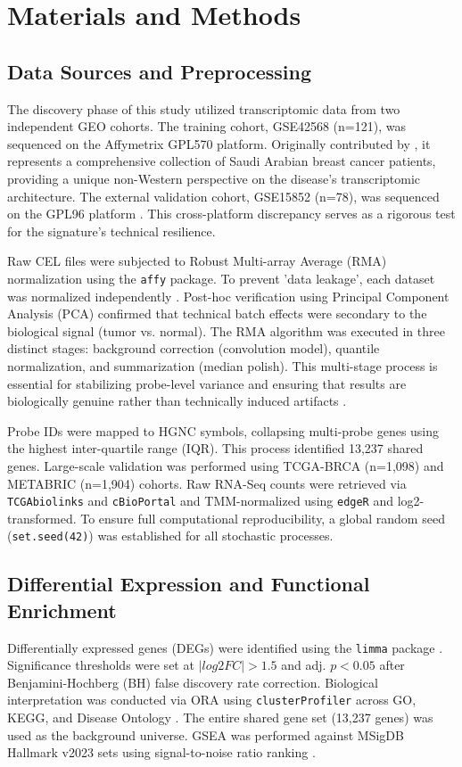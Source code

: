 \documentclass[a4paper,fleqn]{cas-sc}
\begin{document}
\section{Materials and Methods}

\subsection{Data Sources and Preprocessing}
The discovery phase of this study utilized transcriptomic data from two independent GEO cohorts. The training cohort, GSE42568 (n=121), was sequenced on the Affymetrix GPL570 platform. Originally contributed by \citet{siraj2014}, it represents a comprehensive collection of Saudi Arabian breast cancer patients, providing a unique non-Western perspective on the disease's transcriptomic architecture. The external validation cohort, GSE15852 (n=78), was sequenced on the GPL96 platform \citep{sims2014}. This cross-platform discrepancy serves as a rigorous test for the signature's technical resilience.

Raw CEL files were subjected to Robust Multi-array Average (RMA) normalization using the \texttt{affy} package. To prevent 'data leakage', each dataset was normalized independently \citep{sims2014}. Post-hoc verification using Principal Component Analysis (PCA) confirmed that technical batch effects were secondary to the biological signal (tumor vs. normal). The RMA algorithm was executed in three distinct stages: background correction (convolution model), quantile normalization, and summarization (median polish). This multi-stage process is essential for stabilizing probe-level variance and ensuring that results are biologically genuine rather than technically induced artifacts \citep{sun2024}.

Probe IDs were mapped to HGNC symbols, collapsing multi-probe genes using the highest inter-quartile range (IQR). This process identified 13,237 shared genes. Large-scale validation was performed using TCGA-BRCA (n=1,098) and METABRIC (n=1,904) cohorts. Raw RNA-Seq counts were retrieved via \texttt{TCGAbiolinks} and \texttt{cBioPortal} and TMM-normalized using \texttt{edgeR} and log2-transformed. To ensure full computational reproducibility, a global random seed (\texttt{set.seed(42)}) was established for all stochastic processes.

\subsection{Differential Expression and Functional Enrichment}
Differentially expressed genes (DEGs) were identified using the \texttt{limma} package \citep{ritchie2015}. Significance thresholds were set at $|log2FC| > 1.5$ and adj. $p < 0.05$ after Benjamini-Hochberg (BH) false discovery rate correction. Biological interpretation was conducted via ORA using \texttt{clusterProfiler} \citep{yu2012} across GO, KEGG, and Disease Ontology \citep{yu2015}. The entire shared gene set (13,237 genes) was used as the background universe. GSEA was performed against MSigDB Hallmark v2023 sets using signal-to-noise ratio ranking \citep{subramanian2005}.
\end{document}
